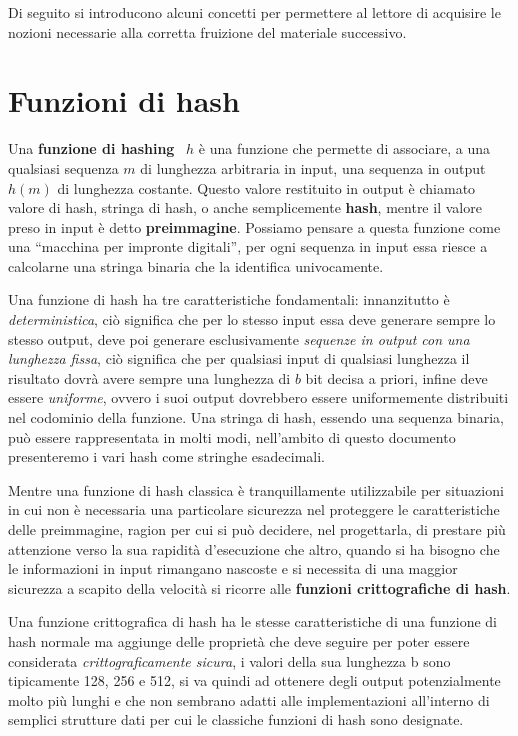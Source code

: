 Di seguito si introducono alcuni concetti 
per permettere al lettore di acquisire le nozioni necessarie alla
corretta fruizione del materiale successivo.

\section{Funzioni di hash}
\label{sub:hash}
Una \textbf{funzione di hashing}~\cite{hash} \(h\) è una funzione che permette di associare,
a una qualsiasi sequenza \(m\) di lunghezza arbitraria in input, una sequenza
in output \(h(m)\) di lunghezza costante. 
Questo valore restituito in output è chiamato valore di hash, stringa di hash,
o anche semplicemente \textbf{hash}, mentre il valore preso in input è detto
\textbf{preimmagine}. Possiamo pensare a questa funzione come una “macchina per
impronte digitali”, per ogni sequenza in input essa riesce a calcolarne una stringa binaria
che la identifica univocamente.

Una funzione di hash ha tre caratteristiche fondamentali:
innanzitutto è \emph{deterministica}, ciò significa che per lo stesso input essa deve
generare sempre lo stesso output, deve poi generare esclusivamente
\emph{sequenze in output con una lunghezza fissa}, ciò significa che per qualsiasi input
di qualsiasi lunghezza il risultato dovrà avere sempre una lunghezza di \(b\) bit decisa
a priori, infine deve essere \emph{uniforme}, ovvero i suoi output dovrebbero essere
uniformemente distribuiti nel codominio della funzione.
Una stringa di hash, essendo una sequenza binaria, può essere rappresentata in molti modi,
nell'ambito di questo documento presenteremo i vari hash come stringhe esadecimali.

Mentre una funzione di hash classica è tranquillamente utilizzabile per situazioni
in cui non è necessaria una particolare sicurezza nel proteggere le caratteristiche
delle preimmagine, ragion per cui si può decidere, nel progettarla, di prestare più
attenzione verso la sua rapidità d'esecuzione che altro, quando si ha bisogno che le
informazioni in input rimangano nascoste e si necessita di una maggior sicurezza a scapito
della velocità si ricorre alle \textbf{funzioni crittografiche di hash}.

Una funzione crittografica di hash ha le stesse caratteristiche di una funzione di
hash normale ma aggiunge delle proprietà che deve seguire per poter essere considerata
\emph{crittograficamente sicura}, i valori della sua lunghezza b sono tipicamente
128, 256 e 512, si va quindi ad ottenere degli output potenzialmente molto più lunghi
e che non sembrano adatti alle implementazioni all'interno di semplici strutture dati
per cui le classiche funzioni di hash sono designate.

